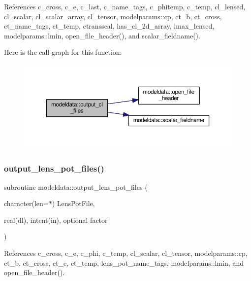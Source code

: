 References c\+\_\+cross, c\+\_\+e, c\+\_\+last, c\+\_\+name\+\_\+tags, c\+\_\+phitemp, c\+\_\+temp, cl\+\_\+lensed, cl\+\_\+scalar, cl\+\_\+scalar\+\_\+array, cl\+\_\+tensor, modelparams\+::cp, ct\+\_\+b, ct\+\_\+cross, ct\+\_\+name\+\_\+tags, ct\+\_\+temp, ctransscal, has\+\_\+cl\+\_\+2d\+\_\+array, lmax\+\_\+lensed, modelparams\+::lmin, open\+\_\+file\+\_\+header(), and scalar\+\_\+fieldname().

Here is the call graph for this function\+:
\nopagebreak
\begin{figure}[H]
\begin{center}
\leavevmode
\includegraphics[width=350pt]{namespacemodeldata_ace30b2a5cf368aaadfbdaf70dcc20a9e_cgraph}
\end{center}
\end{figure}
\mbox{\label{namespacemodeldata_a3db0a7cfe521f110aeef7aaa900d1843}} 
\subsubsection{\texorpdfstring{output\+\_\+lens\+\_\+pot\+\_\+files()}{output\_lens\_pot\_files()}}
{\footnotesize\ttfamily subroutine modeldata\+::output\+\_\+lens\+\_\+pot\+\_\+files (\begin{DoxyParamCaption}\item[{character(len=$\ast$)}]{Lens\+Pot\+File,  }\item[{real(dl), intent(in), optional}]{factor }\end{DoxyParamCaption})}



References c\+\_\+cross, c\+\_\+e, c\+\_\+phi, c\+\_\+temp, cl\+\_\+scalar, cl\+\_\+tensor, modelparams\+::cp, ct\+\_\+b, ct\+\_\+cross, ct\+\_\+e, ct\+\_\+temp, lens\+\_\+pot\+\_\+name\+\_\+tags, modelparams\+::lmin, and open\+\_\+file\+\_\+header().

